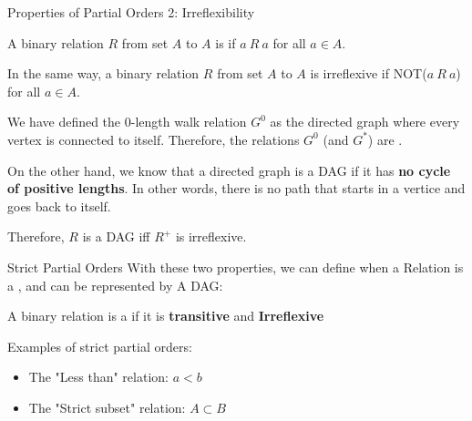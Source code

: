 \begin{frame}[t]{Properties of Partial Orders 2: Irreflexibility}

  A binary relation $R$ from set $A$ to $A$ is  if $a~R~a$ for all $a \in A$.\bigskip 

  In the same way, a binary relation $R$ from set $A$ to $A$ is \alert{irreflexive} if NOT($a~R~a$) for all $a \in A$.\bigskip

  We have defined the 0-length walk relation $G^0$ as the directed graph where every vertex is connected to itself. Therefore, the relations $G^0$ (and $G^*$) are .\bigskip

  On the other hand, we know that a directed graph is a DAG if it has {\bf no cycle of positive lengths}. In other words, there is no path that starts in a vertice and goes back to itself.\bigskip 

  Therefore, \alert{$R$ is a DAG iff $R^+$ is irreflexive}.\bigskip
\end{frame}

\begin{frame}[t]{Strict Partial Orders}
  With these two properties, we can define when a Relation is a , and can be represented by A DAG:\bigskip 

  \begin{block}{}
    A binary relation is a  if it is {\bf transitive} and {\bf Irreflexive}
  \end{block}\bigskip

  Examples of strict partial orders: 
  \begin{itemize}
    \item The "Less than" relation: $a < b$
    \item The "Strict subset" relation: $A \subset B$
  \end{itemize}
\end{frame}

